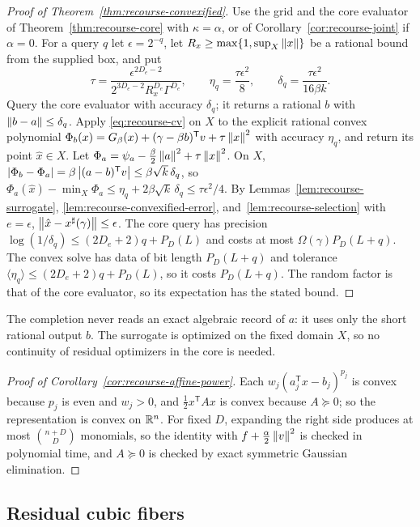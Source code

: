 \begin{proof}[Proof of Theorem~\ref{thm:recourse-convexified}]
Use the grid and the core evaluator of Theorem~\ref{thm:recourse-core}
with $\kappa=\alpha$, or of Corollary~\ref{cor:recourse-joint} if
$\alpha=0$. For a query $q$ let $\epsilon=2^{-q}$, let $R_x\ge
\max\{1,\sup_X\left\lVert x\right\rVert\}$ be a rational bound from the supplied box, and
put
\[
 \tau=\frac{\epsilon^{2D_e-2}}{2^{3D_e-2}R_x^{D_e}\Gamma^{D_e}},\qquad
 \eta_q=\frac{\tau\epsilon^2}8,\qquad
 \delta_q=\frac{\tau\epsilon^2}{16\beta k}.
\]
Query the core evaluator with accuracy $\delta_q$; it returns a rational
$b$ with $\left\lVert b-a\right\rVert\le\delta_q$. Apply \eqref{eq:recourse-cv} on $X$ to
the explicit rational convex polynomial
$\Phi_b(x)=G_\beta(x)+(\gamma-\beta b)^{\mathsf T}v+\tau\left\lVert x\right\rVert^2$ with
accuracy $\eta_q$, and return its point $\hat x\in X$. Let
$\Phi_a=\psi_a-\frac\beta2\left\lVert a\right\rVert^2+\tau\left\lVert x\right\rVert^2$. On $X$,
$\left\lvert\Phi_b-\Phi_a\right\rvert=\beta\left\lvert(a-b)^{\mathsf T}v\right\rvert\le\beta\sqrt k\,\delta_q$,
so
$\Phi_a(\hat x)-\min_X\Phi_a\le\eta_q+2\beta\sqrt k\,\delta_q\le\tau\epsilon^2/4$.
By Lemmas~\ref{lem:recourse-surrogate}, \ref{lem:recourse-convexified-error},
and~\ref{lem:recourse-selection} with $e=\epsilon$,
$\left\lVert\hat x-x^\sharp(\gamma)\right\rVert\le\epsilon$. The core query has precision
$\log(1/\delta_q)\le(2D_e+2)q+P_D(L)$ and costs at most
$\Omega(\gamma)P_D(L+q)$. The convex solve has data of bit length
$P_D(L+q)$ and tolerance $\langle\eta_q\rangle\le(2D_e+2)q+P_D(L)$, so it
costs $P_D(L+q)$. The random
factor is that of the core evaluator, so its expectation has the stated
bound.
\end{proof}

The completion never reads an exact algebraic record of $a$: it uses
only the short rational output $b$. The surrogate is optimized on the
fixed domain $X$, so no continuity of residual optimizers in the core is
needed.

\begin{proof}[Proof of Corollary~\ref{cor:recourse-affine-power}]
Each $w_j(a_j^{\mathsf T}x-b_j)^{p_j}$ is convex because $p_j$ is even
and $w_j>0$, and $\frac12x^{\mathsf T}Ax$ is convex because
$A\succeq0$; so the representation is convex on $\mathbb R^n$. For fixed $D$,
expanding the right side produces at most $\binom{n+D}D$ monomials, so
the identity with $f+\frac\alpha2\left\lVert v\right\rVert^2$ is checked in polynomial
time, and $A\succeq0$ is checked by exact symmetric Gaussian elimination.
\end{proof}

\subsection{Residual cubic fibers}
\label{app:recourse-fiber}

